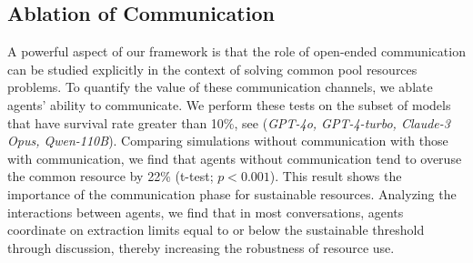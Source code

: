 \documentclass{article}
\begin{document}
\subsection{Ablation of Communication}
\label{sub:role_of_language}
A powerful aspect of our framework is that the role of open-ended communication can be studied explicitly in the context of solving common pool resources problems. To quantify the value of these communication channels, we ablate agents' ability to communicate. We perform these tests on the subset of models that have survival rate greater than 10\%, see  (\textit{GPT-4o, GPT-4-turbo, Claude-3 Opus, Qwen-110B}).
%
Comparing simulations without communication with those with communication, we find that agents without communication tend to overuse the common resource by 22\% (t-test; $p<0.001$).
This result shows the importance of the communication phase for sustainable resources. 
%
Analyzing the interactions between agents, we find that in most conversations, agents coordinate on extraction limits equal to or below the sustainable threshold through discussion, thereby increasing the robustness of resource use.
\end{document}
